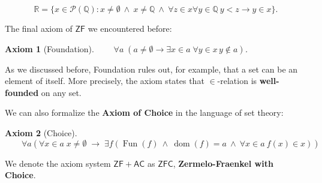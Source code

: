 \documentclass{article}
\newcommand{\ZF}{\mathsf{ZF}}
\newcommand{\Op}[1]{\operatorname{#1}}
\newcommand{\Rat}{\mathbb{Q}}
\newcommand{\Real}{\mathbb{R}}
\newcommand{\AC}{\mathsf{AC}}
\newcommand{\ZFC}{\mathsf{ZFC}}
\newtheorem{axiom}{Axiom}[section]
\begin{document}
\begin{equation}
\Real = \{ x \in \mathcal{P}(\Rat) \colon x \neq \emptyset \: \wedge \: x \neq \Rat \: \wedge \: \forall z \in x \forall y \in \Rat \: y < z \to y \in x \}.
\end{equation}

The final axiom of $\ZF$ we encountered before:

\begin{axiom}[Foundation]$\qquad \forall a \;( a \neq \emptyset \to \exists x \in a \; \forall y \in x \, y \not \in a)$.

\end{axiom}As we discussed before, Foundation rules out, for example, that a set can be an element of itself. More precisely, the axiom states that $\in$-relation is \textbf{well-founded} on any set.

We can also formalize the \textbf{Axiom of Choice} in the language of set theory:

\begin{axiom}[Choice]$\qquad \forall a ( \forall x \in a \; x \neq \emptyset \; \to \; \exists f (\Op{Fun}(f) \:\wedge\: \Op{dom}(f) = a \:\wedge\: \forall x \in a \: f(x) \in x))$

\end{axiom}We denote the axiom system $\ZF + \AC$ as $\ZFC$, \textbf{Zermelo-Fraenkel with Choice}.

\clearpage

\end{document}
